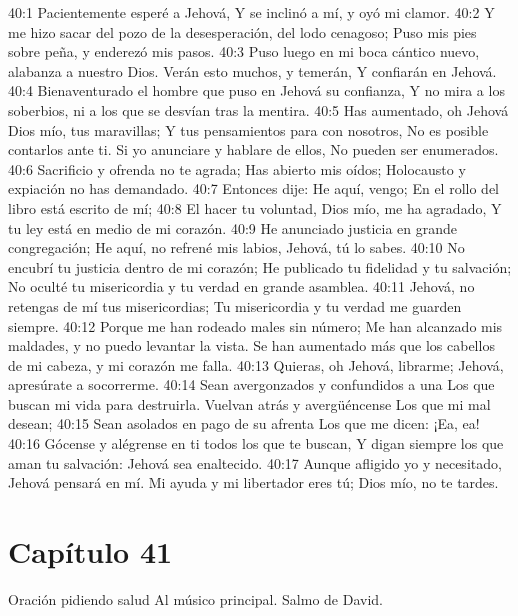 40:1 Pacientemente esperé a Jehová, 
Y se inclinó a mí, y oyó mi clamor. 
40:2 Y me hizo sacar del pozo de la desesperación, del lodo cenagoso; 
Puso mis pies sobre peña, y enderezó mis pasos. 
40:3 Puso luego en mi boca cántico nuevo, alabanza a nuestro Dios. 
Verán esto muchos, y temerán, 
Y confiarán en Jehová. 
40:4 Bienaventurado el hombre que puso en Jehová su confianza, 
Y no mira a los soberbios, ni a los que se desvían tras la mentira. 
40:5 Has aumentado, oh Jehová Dios mío, tus maravillas; 
Y tus pensamientos para con nosotros, 
No es posible contarlos ante ti. 
Si yo anunciare y hablare de ellos, 
No pueden ser enumerados. 
40:6 Sacrificio y ofrenda no te agrada; 
Has abierto mis oídos; 
Holocausto y expiación no has demandado. 
40:7 Entonces dije: He aquí, vengo; 
En el rollo del libro está escrito de mí; 
40:8 El hacer tu voluntad, Dios mío, me ha agradado, 
Y tu ley está en medio de mi corazón. 
40:9 He anunciado justicia en grande congregación; 
He aquí, no refrené mis labios, 
Jehová, tú lo sabes. 
40:10 No encubrí tu justicia dentro de mi corazón; 
He publicado tu fidelidad y tu salvación; 
No oculté tu misericordia y tu verdad en grande asamblea. 
40:11 Jehová, no retengas de mí tus misericordias; 
Tu misericordia y tu verdad me guarden siempre. 
40:12 Porque me han rodeado males sin número; 
Me han alcanzado mis maldades, y no puedo levantar la vista. 
Se han aumentado más que los cabellos de mi cabeza, y mi corazón me falla. 
40:13 Quieras, oh Jehová, librarme; 
Jehová, apresúrate a socorrerme. 
40:14 Sean avergonzados y confundidos a una 
Los que buscan mi vida para destruirla. 
Vuelvan atrás y avergüéncense 
Los que mi mal desean; 
40:15 Sean asolados en pago de su afrenta 
Los que me dicen: ¡Ea, ea! 
40:16 Gócense y alégrense en ti todos los que te buscan, 
Y digan siempre los que aman tu salvación: 
Jehová sea enaltecido. 
40:17 Aunque afligido yo y necesitado, 
Jehová pensará en mí. 
Mi ayuda y mi libertador eres tú; 
Dios mío, no te tardes. 
\section*{Capítulo 41}
Oración pidiendo salud 
Al músico principal. Salmo de David. 
 
